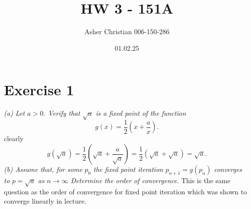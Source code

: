 \documentclass{amsart}
\title{HW 3 - 151A}
\author{Asher Christian 006-150-286}
\date{ 01.02.25}
\begin{document}
    \maketitle
    \section{Exercise 1}
    \emph{
        (a) Let $a > 0$. Verify that $\sqrt{a}$ is a fixed point of the function
        \[
        g(x) = \frac{1}{2}(x+\frac{a}{x})
        .\] 
    }
    clearly
    \[
    g(\sqrt{a}) = \frac{1}{2}(\sqrt{a} + \frac{a}{\sqrt{a}}) = \frac{1}{2}(\sqrt{a} + \sqrt{a}) = \sqrt{a}
    .\] 
    \emph{
        (b) Assume that, for some $p_0$ the fixed point iteration $p_{n+1} = g(p_n)$ converges to
        $p = \sqrt{a}$ as $n \rightarrow \infty$ Determine the order of convergence.
    }
    This is the same question as the order of convergence for fixed point iteration which was shown to converge linearly in lecture.
\end{document}
